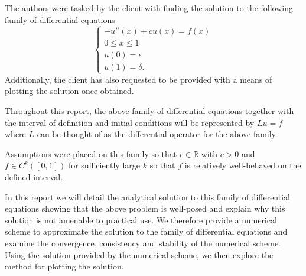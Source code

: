 The authors were tasked by the client with finding the solution to the following
family of differential equations
\[
  \begin{cases}
    -u''(x) + c u(x) = f(x) \\
    0 \leq x \leq 1 \\
    u(0) = \epsilon \\
    u(1) = \delta.
  \end{cases}
\]
Additionally, the client has also requested to be provided with a means of
plotting the solution once obtained.

Throughout this report, the above family of differential equations together with
the interval of definition and initial conditions will be represented by
$Lu = f$ where $L$ can be thought of as the differential operator for the above family.

Assumptions were placed on this family so that $c \in \mathbb{R}$ with $c > 0$
and $f \in C^k([0,1])$ for sufficiently large $k$ so that $f$ is relatively
well-behaved on the defined interval.

In this report we will detail the analytical solution to this family of
differential equations showing that the above problem is well-posed and
explain why this solution is not amenable to practical use. We therefore
provide a numerical scheme to approximate the solution to the family of
differential equations and examine the convergence, consistency and stability
of the numerical scheme. Using the solution provided by the numerical scheme,
we then explore the method for plotting the solution.

